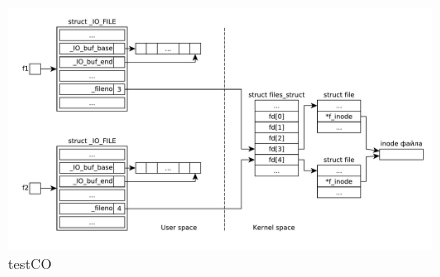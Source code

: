 \documentclass[a4paper,oneside,12pt]{extreport}
\begin{document}
\begin{figure}[H]
	\centering
	\includegraphics[scale=0.65]{inc/img/testCO}
	\caption{testCO}
	\label{img:testCO}
\end{figure}


\end{document}
